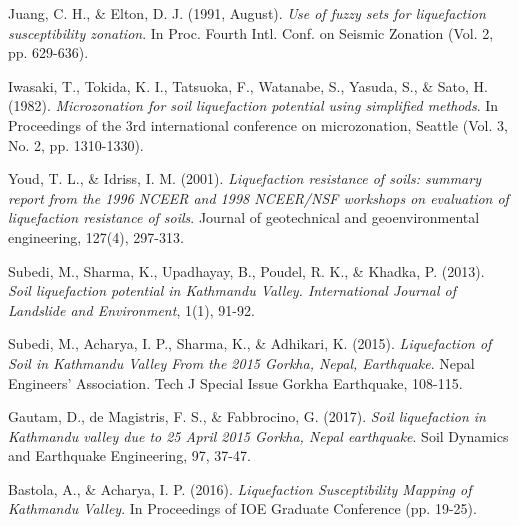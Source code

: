 \begin{thebibliography}{99}
Juang, C. H., \& Elton, D. J. (1991, August). \emph{Use of fuzzy sets for liquefaction susceptibility zonation}. In Proc. Fourth Intl. Conf. on Seismic Zonation (Vol. 2, pp. 629-636).

Iwasaki, T., Tokida, K. I., Tatsuoka, F., Watanabe, S., Yasuda, S., \& Sato, H. (1982). \emph{Microzonation for soil liquefaction potential using simplified methods}. In Proceedings of the 3rd international conference on microzonation, Seattle (Vol. 3, No. 2, pp. 1310-1330).

Youd, T. L., \& Idriss, I. M. (2001). \emph{Liquefaction resistance of soils: summary report from the 1996 NCEER and 1998 NCEER/NSF workshops on evaluation of liquefaction resistance of soils}. Journal of geotechnical and geoenvironmental engineering, 127(4), 297-313.

Subedi, M., Sharma, K., Upadhayay, B., Poudel, R. K., \& Khadka, P. (2013). \emph{Soil liquefaction potential in Kathmandu Valley. International Journal of Landslide and Environment}, 1(1), 91-92.

Subedi, M., Acharya, I. P., Sharma, K., \& Adhikari, K. (2015). \emph{Liquefaction of Soil in Kathmandu Valley From the 2015 Gorkha, Nepal, Earthquake}. Nepal Engineers’ Association. Tech J Special Issue Gorkha Earthquake, 108-115.

Gautam, D., de Magistris, F. S., \& Fabbrocino, G. (2017). \emph{Soil liquefaction in Kathmandu valley due to 25 April 2015 Gorkha, Nepal earthquake}. Soil Dynamics and Earthquake Engineering, 97, 37-47.

Bastola, A., \& Acharya, I. P. (2016). \emph{Liquefaction Susceptibility Mapping of Kathmandu Valley}. In Proceedings of IOE Graduate Conference (pp. 19-25).

\end{thebibliography}